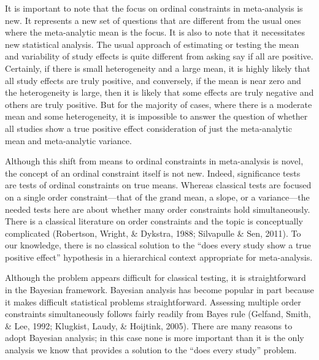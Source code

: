 \documentclass[english,man]{apa6}
\theoremstyle{definition}
\theoremstyle{definition}
\theoremstyle{definition}
\theoremstyle{remark}
\begin{document}
It is important to note that the focus on ordinal constraints in
meta-analysis is new. It represents a new set of questions that are
different from the usual ones where the meta-analytic mean is the focus.
It is also to note that it necessitates new statistical analysis. The
usual approach of estimating or testing the mean and variability of
study effects is quite different from asking say if all are positive.
Certainly, if there is small heterogeneity and a large mean, it is
highly likely that all study effects are truly positive, and conversely,
if the mean is near zero and the heterogeneity is large, then it is
likely that some effects are truly negative and others are truly
positive. But for the majority of cases, where there is a moderate mean
and some heterogeneity, it is impossible to answer the question of
whether all studies show a true positive effect consideration of just
the meta-analytic mean and meta-analytic variance.

Although this shift from means to ordinal constraints in meta-analysis
is novel, the concept of an ordinal constraint itself is not new.
Indeed, significance tests are tests of ordinal constraints on true
means. Whereas classical tests are focused on a single order
constraint---that of the grand mean, a slope, or a variance---the needed
tests here are about whether many order constraints hold simultaneously.
There is a classical literature on order constraints and the topic is
conceptually complicated (Robertson, Wright, \& Dykstra, 1988;
Silvapulle \& Sen, 2011). To our knowledge, there is no classical
solution to the \enquote{does every study show a true positive effect}
hypothesis in a hierarchical context appropriate for meta-analysis.

Although the problem appears difficult for classical testing, it is
straightforward in the Bayesian framework. Bayesian analysis has become
popular in part because it makes difficult statistical problems
straightforward. Assessing multiple order constraints simultaneously
follows fairly readily from Bayes rule (Gelfand, Smith, \& Lee, 1992;
Klugkist, Laudy, \& Hoijtink, 2005). There are many reasons to adopt
Bayesian analysis; in this case none is more important than it is the
only analysis we know that provides a solution to the \enquote{does
every study} problem.
\end{document}
